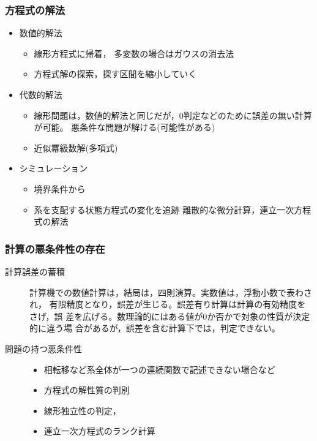 \documentclass[dvipdfmx,11pat]{jarticle}
\begin{document}
\subsubsection{方程式の解法}
\label{sec:org5fb061b}
\begin{itemize}
\item 数値的解法
\begin{itemize}
\item 線形方程式に帰着， 多変数の場合はガウスの消去法
\item 方程式解の探索，探す区間を縮小していく
\end{itemize}

\item 代数的解法
\begin{itemize}
\item 線形問題は，数値的解法と同じだが，0判定などのために誤差の無い計算が可能。
悪条件な問題が解ける(可能性がある)

\item 近似羃級数解(多項式)
\end{itemize}

\item シミュレーション 
\begin{itemize}
\item 境界条件から
\item 系を支配する状態方程式の変化を追跡
離散的な微分計算，連立一次方程式の解法
\end{itemize}
\end{itemize}
\subsubsection{計算の悪条件性の存在}
\label{sec:org89cf1c8}
\begin{description}
\item[{計算誤差の蓄積}] 計算機での数値計算は，結局は，四則演算。実数値は，浮動小数で表わされ，
有限精度となり，誤差が生じる。誤差有り計算は計算の有効精度をさげ，誤
差を広げる。数理論的にはある値が0か否かで対象の性質が決定的に違う場
合があるが，誤差を含む計算下では，判定できない。

\item[{問題の持つ悪条件性}] \begin{itemize}
\item 相転移など系全体が一つの連続関数で記述できない場合など
\item 方程式の解性質の判別
\item 線形独立性の判定，
\item 連立一次方程式のランク計算
\end{itemize}
\end{description}
\end{document}
